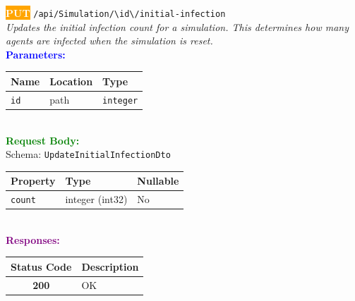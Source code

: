 \begin{tcolorbox}[
    colback=orange!5,
    colframe=orange,
    arc=2mm,
    boxrule=1pt,
    left=5pt,
    right=5pt,
    top=5pt,
    bottom=5pt
]
\noindent\colorbox{orange}{\textcolor{white}{\textbf{PUT}}} 
\texttt{\large /api/Simulation/\textbackslash{}{id\textbackslash{}}/initial-infection}\\[0.3em]
\textit{Updates the initial infection count for a simulation.
This determines how many agents are infected when the simulation is reset.}\\[0.3em]
\vspace{0.3em}
\textbf{\textcolor{blue}{Parameters:}}\\[0.2em]
\begin{tabular}{|l|l|l|}
\hline
\rowcolor{gray!20}
\textbf{Name} & \textbf{Location} & \textbf{Type} \\ \hline
\texttt{id} & path & \texttt{integer} \\ \hline
\end{tabular}\\[0.5em]
\vspace{0.3em}
\textbf{\textcolor{green}{Request Body:}}\\[0.2em]
Schema: \texttt{UpdateInitialInfectionDto}\\[0.3em]
\begin{tabular}{|l|l|l|}
\hline
\rowcolor{green!10}
\textbf{Property} & \textbf{Type} & \textbf{Nullable} \\ \hline
\texttt{count} & integer (int32) & No \\ \hline
\end{tabular}\\[0.5em]
\vspace{0.3em}
\textbf{\textcolor{purple}{Responses:}}\\[0.2em]
\begin{tabular}{|c|p{10cm}|}
\hline
\rowcolor{gray!20}
\textbf{Status Code} & \textbf{Description} \\ \hline
\colorbox{green!20}{\textbf{200}} & OK \\ \hline
\end{tabular}
\end{tcolorbox}
\vspace{0.5em}

